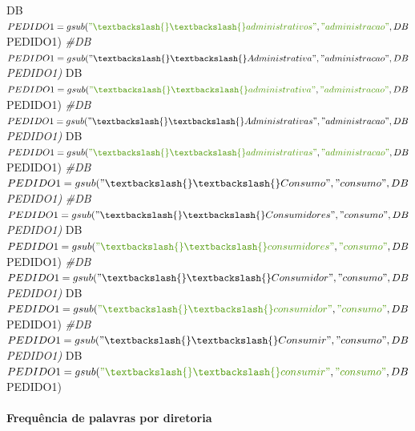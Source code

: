 \documentclass[]{article}
\newenvironment{Shaded}{\begin{snugshade}}{\end{snugshade}}
\newcommand{\CommentTok}[1]{\textcolor[rgb]{0.56,0.35,0.01}{\textit{#1}}}
\newcommand{\DataTypeTok}[1]{\textcolor[rgb]{0.13,0.29,0.53}{#1}}
\newcommand{\KeywordTok}[1]{\textcolor[rgb]{0.13,0.29,0.53}{\textbf{#1}}}
\newcommand{\NormalTok}[1]{#1}
\newcommand{\OperatorTok}[1]{\textcolor[rgb]{0.81,0.36,0.00}{\textbf{#1}}}
\newcommand{\OtherTok}[1]{\textcolor[rgb]{0.56,0.35,0.01}{#1}}
\newcommand{\StringTok}[1]{\textcolor[rgb]{0.31,0.60,0.02}{#1}}
\let\oldparagraph\paragraph
\renewcommand{\paragraph}[1]{\oldparagraph{#1}\mbox{}}
\begin{document}
\begin{Shaded}
\begin{Highlighting}[]
\NormalTok{DB$PEDIDO1 =gsub(}\StringTok{"\textbackslash{}\textbackslash{} administrativos "}\NormalTok{, }\StringTok{"administracao"}\NormalTok{, DB$PEDIDO1)}
\CommentTok{#DB$PEDIDO1 =gsub("\textbackslash{}\textbackslash{} Administrativa ", "administracao", DB$PEDIDO1)}
\NormalTok{DB$PEDIDO1 =gsub(}\StringTok{"\textbackslash{}\textbackslash{} administrativa "}\NormalTok{, }\StringTok{"administracao"}\NormalTok{, DB$PEDIDO1)}
\CommentTok{#DB$PEDIDO1 =gsub("\textbackslash{}\textbackslash{} Administrativas ", "administracao", DB$PEDIDO1)}
\NormalTok{DB$PEDIDO1 =gsub(}\StringTok{"\textbackslash{}\textbackslash{} administrativas "}\NormalTok{, }\StringTok{"administracao"}\NormalTok{, DB$PEDIDO1)}
\CommentTok{#DB$PEDIDO1 =gsub("\textbackslash{}\textbackslash{} Consumo ", "consumo", DB$PEDIDO1)}
\CommentTok{#DB$PEDIDO1 =gsub("\textbackslash{}\textbackslash{} Consumidores ", "consumo", DB$PEDIDO1)}
\NormalTok{DB$PEDIDO1 =gsub(}\StringTok{"\textbackslash{}\textbackslash{} consumidores "}\NormalTok{, }\StringTok{"consumo"}\NormalTok{, DB$PEDIDO1)}
\CommentTok{#DB$PEDIDO1 =gsub("\textbackslash{}\textbackslash{} Consumidor ", "consumo", DB$PEDIDO1)}
\NormalTok{DB$PEDIDO1 =gsub(}\StringTok{"\textbackslash{}\textbackslash{} consumidor "}\NormalTok{, }\StringTok{"consumo"}\NormalTok{, DB$PEDIDO1)}
\CommentTok{#DB$PEDIDO1 =gsub("\textbackslash{}\textbackslash{} Consumir ", "consumo", DB$PEDIDO1)}
\NormalTok{DB$PEDIDO1 =gsub(}\StringTok{"\textbackslash{}\textbackslash{} consumir "}\NormalTok{, }\StringTok{"consumo"}\NormalTok{, DB$PEDIDO1)}
\end{Highlighting}
\end{Shaded}

\hypertarget{frequencia-de-palavras-por-diretoria}{%
\paragraph{Frequência de palavras por
diretoria}\label{frequencia-de-palavras-por-diretoria}}

\begin{Shaded}
\end{Shaded}
\end{document}
